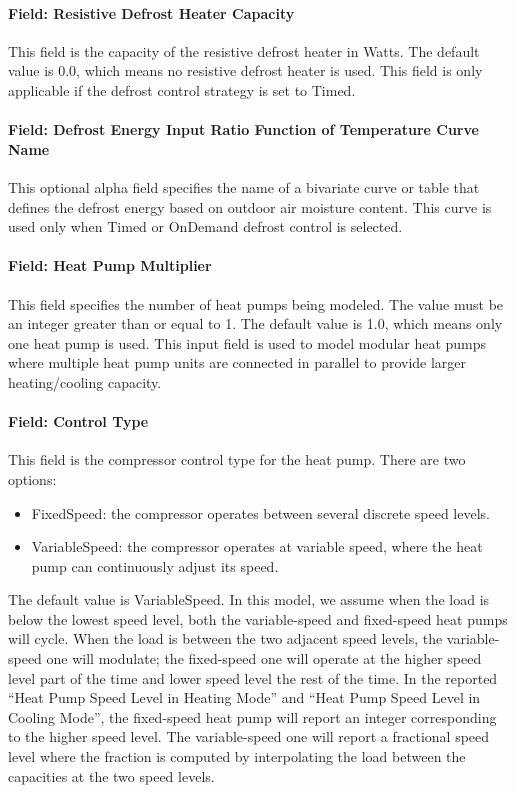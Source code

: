 \paragraph{Field: Resistive Defrost Heater Capacity} This field is the capacity
of the resistive defrost heater in Watts. The default value is 0.0, which means
no resistive defrost heater is used. This field is only applicable if the
defrost control strategy is set to Timed.
\paragraph{Field: Defrost Energy Input Ratio Function of Temperature Curve Name}
This optional alpha field specifies the name of a bivariate curve or table that
defines the defrost energy based on outdoor air moisture content. This curve is
used only when Timed or OnDemand defrost control is selected.
\paragraph{Field: Heat Pump Multiplier} This field specifies the number of heat
pumps being modeled. The value must be an integer greater than or equal to 1.
The default value is 1.0, which means only one heat pump is used. This input
field is used to model modular heat pumps where multiple heat pump units are
connected in parallel to provide larger heating/cooling capacity.
\paragraph{Field: Control Type} This field is the compressor control type for
the heat pump. There are two options:

\begin{itemize}
\item FixedSpeed: the compressor operates between several discrete speed levels.
\item VariableSpeed: the compressor operates at variable speed, where the heat
  pump can continuously adjust its speed.
\end{itemize}
The default value is VariableSpeed. In this model, we assume when the load is
below the lowest speed level, both the variable-speed and fixed-speed heat pumps
will cycle. When the load is between the two adjacent speed levels, the
variable-speed one will modulate; the fixed-speed one will operate at the higher
speed level part of the time and lower speed level the rest of the time. In the
reported ``Heat Pump Speed Level in Heating Mode'' and ``Heat Pump Speed Level
in Cooling Mode'', the fixed-speed heat pump will report an integer corresponding to
the higher speed level. The variable-speed one will report a fractional speed
level where the fraction is computed by interpolating the load between the capacities
at the two speed levels.
